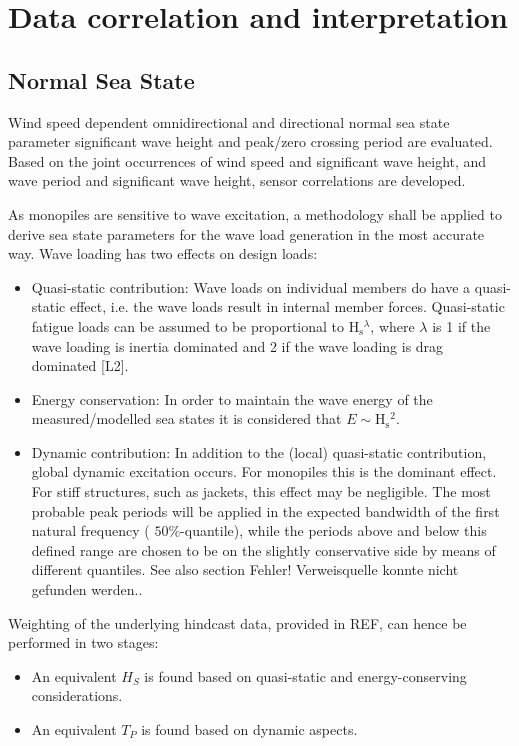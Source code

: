 \section{Data correlation and interpretation}
\subsection{Normal Sea State}

Wind speed dependent omnidirectional and directional normal sea state parameter significant wave height and peak/zero crossing period are evaluated. Based on the joint occurrences of wind speed and significant wave height, and wave period and significant wave height, sensor correlations are developed.

As monopiles are sensitive to wave excitation, a methodology shall be applied to derive sea state parameters for the wave load generation in the most accurate way. Wave loading has two effects on design loads:

\begin{itemize}
  \item Quasi-static contribution: Wave loads on individual members do have a quasi-static effect, i.e. the wave loads result in internal member forces. Quasi-static fatigue loads can be assumed to be proportional to $\mathrm{H}_{\mathrm{s}}{ }^{\lambda}$, where $\lambda$ is 1 if the wave loading is inertia dominated and 2 if the wave loading is drag dominated [L2].
  \item Energy conservation: In order to maintain the wave energy of the measured/modelled sea states it is considered that $E \sim \mathrm{H}_{\mathrm{s}}{ }^{2}$.
  \item Dynamic contribution: In addition to the (local) quasi-static contribution, global dynamic excitation occurs. For monopiles this is the dominant effect. For stiff structures, such as jackets, this effect may be negligible. The most probable peak periods will be applied in the expected bandwidth of the first natural frequency ( $50 \%$-quantile), while the periods above and below this defined range are chosen to be on the slightly conservative side by means of different quantiles. See also section Fehler! Verweisquelle konnte nicht gefunden werden..
\end{itemize}

Weighting of the underlying hindcast data, provided in REF, can hence be performed in two stages:

\begin{itemize}
  \item An equivalent $H_{S}$ is found based on quasi-static and energy-conserving considerations.
  \item An equivalent $T_{P}$ is found based on dynamic aspects.
\end{itemize}

